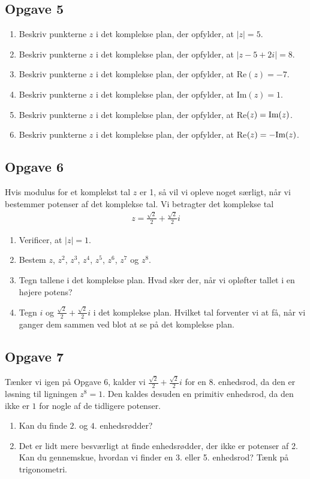 \subsection*{Opgave 5}
\begin{enumerate}[label=\roman*)]
	\item Beskriv punkterne $z$ i det komplekse plan, der opfylder, at $|z| = 5$.
	\item Beskriv punkterne $z$ i det komplekse plan, der opfylder, at $|z-5 + 2i| = 8$.
	\item Beskriv punkterne $z$ i det komplekse plan, der opfylder, at Re$(z)=-7$.
	\item Beskriv punkterne $z$ i det komplekse plan, der opfylder, at Im$(z) = 1$.
	\item Beskriv punkterne $z$ i det komplekse plan, der opfylder, at Re$(z) = \textnormal{Im}(z)$. 
	\item Beskriv punkterne $z$ i det komplekse plan, der opfylder, at Re$(z) = -\textnormal{Im}(z)$. 
\end{enumerate}

\subsection*{Opgave 6}
Hvis modulus for et komplekst tal $z$ er 1, så vil vi opleve noget særligt, når vi bestemmer potenser af det komplekse tal. Vi betragter det komplekse tal 
\begin{align*}
	z = \frac{\sqrt{2}}{2} + \frac{\sqrt{2}}{2}i
\end{align*}
\begin{enumerate}[label=\roman*)]
	\item Verificer, at $|z| = 1$.
	\item Bestem $z$, $z^2$, $z^3$, $z^4$, $z^5$, $z^6$, $z^7$ og $z^8$.
	\item Tegn tallene i det komplekse plan. Hvad sker der, når vi opløfter tallet i en højere potens?
	\item Tegn $i$ og $\frac{\sqrt{2}}{2} + \frac{\sqrt{2}}{2}i$ i det komplekse plan. Hvilket tal forventer vi at få, 
	når vi ganger dem sammen ved blot at se på det komplekse plan. 
\end{enumerate}

\subsection*{Opgave 7}
Tænker vi igen på Opgave 6, kalder vi $\frac{\sqrt{2}}{2} + \frac{\sqrt{2}}{2}i$ for en 8. enhedsrod, da den er løsning til ligningen $z^8 = 1$. Den kaldes desuden en primitiv enhedsrod, da den ikke er $1$ for nogle af de tidligere potenser.
\begin{enumerate}[label=\roman*)]
	\item Kan du finde $2.$ og $4.$ enhedsrødder?
	\item Det er lidt mere besværligt at finde enhedsrødder, der ikke er potenser af 2. Kan du gennemskue, hvordan vi 
	finder en 3. eller 5. enhedsrod? Tænk på trigonometri. 
\end{enumerate}

